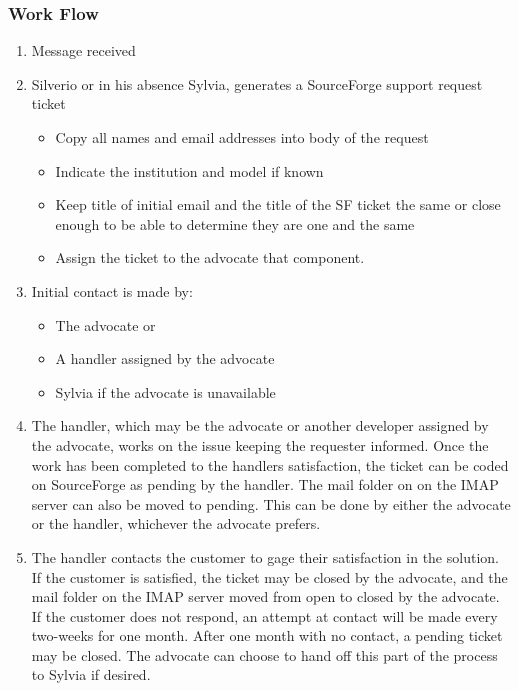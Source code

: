 \subsubsection{Work Flow}
\begin{enumerate}
\item Message received
\item Silverio or in his absence Sylvia, generates a SourceForge support request ticket

\begin{itemize}
\item Copy all names and email addresses into body of the request
\item Indicate the institution and model if known
\item Keep title of initial email and the title of the SF ticket the same or close enough to be able to determine they are one and the same
\item Assign the ticket to the advocate that component. 
\end{itemize}

\item Initial contact is made by:

\begin{itemize}
\item The advocate or
\item A handler assigned by the advocate
\item Sylvia if the advocate is unavailable
\end{itemize}

\item The handler, which may be the advocate or another developer assigned by the advocate, works on the issue keeping the requester informed. Once the work has been completed to the handlers satisfaction, the ticket can be coded on SourceForge as pending by the handler.  The mail folder on 
on the IMAP server can also be moved to pending. This can be done by either the advocate or the handler, whichever the advocate prefers.

\item The handler contacts the customer to gage their satisfaction in the solution. If the customer is satisfied, the ticket may be closed by the advocate, and the mail folder on the IMAP server moved from open to 
closed by the advocate.  If the customer does not respond, an attempt at contact will be made every two-weeks for one month.  After one month with no contact, a pending ticket may be closed. The advocate can choose to hand off this part of the process to Sylvia if desired. 
\end{enumerate}

